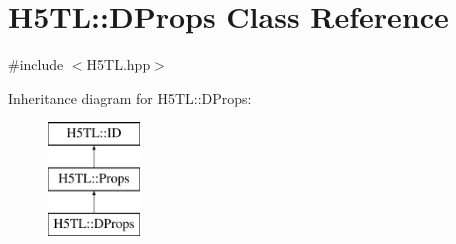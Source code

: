 \hypertarget{class_h5_t_l_1_1_d_props}{\section{H5\-T\-L\-:\-:D\-Props Class Reference}
\label{class_h5_t_l_1_1_d_props}
}


{\ttfamily \#include $<$H5\-T\-L.\-hpp$>$}

Inheritance diagram for H5\-T\-L\-:\-:D\-Props\-:\begin{figure}[H]
\begin{center}
\leavevmode
\includegraphics[height=3.000000cm]{class_h5_t_l_1_1_d_props}
\end{center}
\end{figure}
